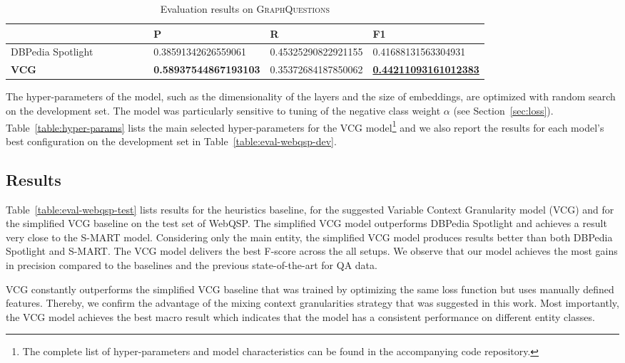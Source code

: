 \documentclass[11pt,a4paper]{article}
\begin{document}
\begin{table}[t]
  \begin{center}
  \begin{tabular}{>{\raggedleft}p{0.4\linewidth}
  >{\raggedleft}p{0.18\linewidth}
  >{\raggedleft}p{0.1\linewidth}   
  >{\raggedleft\arraybackslash}p{0.1\linewidth}}
  \toprule 
  & P & R & F1\\ 
    \midrule 
    DBPedia Spotlight & \num{0.38591342626559061} & \num{0.45325290822921155} & \num{0.41688131563304931} \\
    \textbf{VCG} & \textbf{\num{0.58937544867193103}} & \num{0.35372684187850062} & \underline{\textbf{\num{0.44211093161012383}}}\\ \bottomrule
  \end{tabular} 
  \end{center}
  \caption{Evaluation results on \textsc{GraphQuestions}\label{table:eval-graph-test}}
\end{table}


The hyper-parameters of the model, such as the dimensionality of the layers and the size of embeddings, are optimized with random search on the development set. The model was particularly sensitive to tuning of the negative class weight $\alpha$ (see Section~\ref{sec:loss}). Table~\ref{table:hyper-params} lists the main selected hyper-parameters for the VCG model\footnote{The complete list of hyper-parameters and model characteristics can be found in the accompanying code repository.} and we also report the results for each model's best configuration on the development set in Table~\ref{table:eval-webqsp-dev}.


\subsection{Results}

Table~\ref{table:eval-webqsp-test} lists results for the heuristics baseline, for the suggested Variable Context Granularity model (VCG) and for the simplified VCG baseline on the test set of WebQSP.
The simplified VCG model outperforms DBPedia Spotlight and achieves a result very close to the S-MART model. 
Considering only the main entity, the simplified VCG model produces results better than both DBPedia Spotlight and S-MART. 
The VCG model delivers the best F-score across the all setups. We observe that our model achieves the most gains in precision compared to the baselines and the previous state-of-the-art for QA data. 

VCG constantly outperforms the simplified VCG baseline that was trained by optimizing the same loss function but uses manually defined features. Thereby, we confirm the advantage of the mixing context granularities strategy that was suggested in this work.
Most importantly, the VCG model achieves the best macro result which indicates that the model has a consistent performance on different entity classes.
\end{document}
